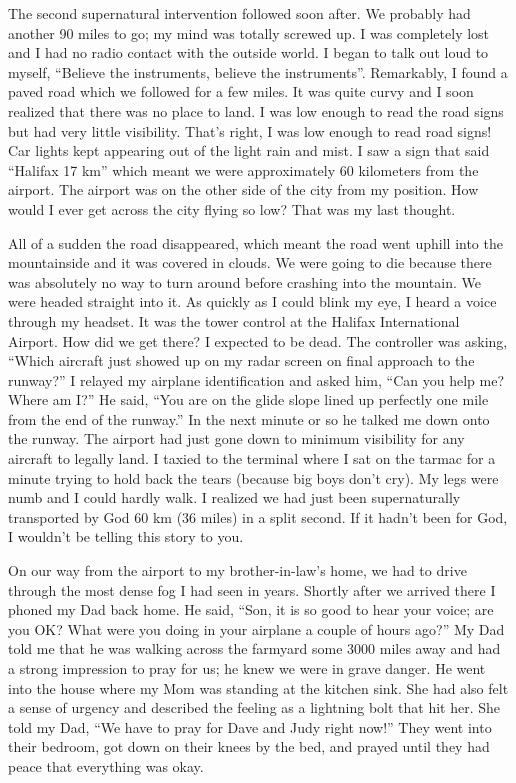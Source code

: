 \documentclass[twoside, 12pt]{book}
\begin{document}
The second supernatural intervention followed soon after. We probably had another 90 miles to go; my mind was totally screwed up. I was completely lost and I had no radio contact with the outside world. I began to talk out loud to myself, “Believe the instruments, believe the instruments”. Remarkably, I found a paved road which we followed for a few miles. It was quite curvy and I soon realized that there was no place to land. I was low enough to read the road signs but had very little visibility. That’s right, I was low enough to read road signs! Car lights kept appearing out of the light rain and mist. I saw a sign that said “Halifax 17 km” which meant we were approximately 60 kilometers from the airport. The airport was on the other side of the city from my position. How would I ever get across the city flying so low? That was my last thought. 

All of a sudden the road disappeared, which meant the road went uphill into the mountainside and it was covered in clouds. We were going to die because there was absolutely no way to turn around before crashing into the mountain. We were headed straight into it. As quickly as I could blink my eye, I heard a voice through my headset. It was the tower control at the Halifax International Airport. How did we get there? I expected to be dead. The controller was asking, “Which aircraft just showed up on my radar screen on final approach to the runway?” I relayed my airplane identification and asked him, “Can you help me? Where am I?” He said, “You are on the glide slope lined up perfectly one mile from the end of the runway.” In the next minute or so he talked me down onto the runway. The airport had just gone down to minimum visibility for any aircraft to legally land. I taxied to the terminal where I sat on the tarmac for a minute trying to hold back the tears (because big boys don't cry). My legs were numb and I could hardly walk. I realized we had just been supernaturally transported by God 60 km (36 miles) in a split second. If it hadn’t been for God, I wouldn't be telling this story to you.

On our way from the airport to my brother-in-law's home, we had to drive through the most dense fog I had seen in years. Shortly after we arrived there I phoned my Dad back home. He said, “Son, it is so good to hear your voice; are you OK? What were you doing in your airplane a couple of hours ago?” My Dad told me that he was walking across the farmyard some 3000 miles away and had a strong impression to pray for us; he knew we were in grave danger. He went into the house where my Mom was standing at the kitchen sink. She had also felt a sense of urgency and described the feeling as a lightning bolt that hit her. She told my Dad, “We have to pray for Dave and Judy right now!” They went into their bedroom, got down on their knees by the bed, and prayed until they had peace that everything was okay.
\end{document}
